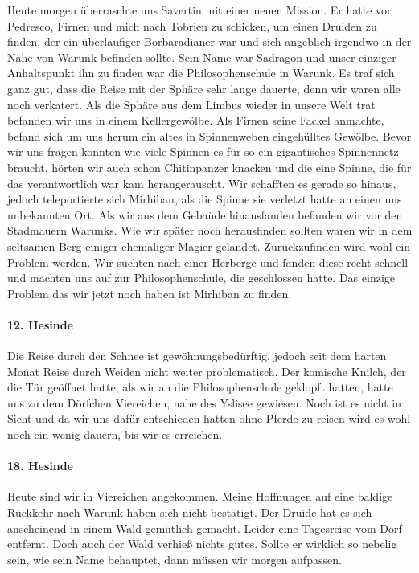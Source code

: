 Heute morgen überraschte uns Savertin mit einer neuen Mission. Er hatte vor Pedresco, Firnen und mich nach Tobrien zu schicken, um einen Druiden zu finden, der ein überläufiger Borbaradianer war und sich angeblich irgendwo in der Nähe von Warunk befinden sollte. Sein Name war Sadragon und unser einziger Anhaltspunkt ihn zu finden war die Philosophenschule in Warunk. Es traf sich ganz gut, dass die Reise mit der Sphäre sehr lange dauerte, denn wir waren alle noch verkatert. Als die Sphäre aus dem Limbus wieder in unsere Welt trat befanden wir uns in einem Kellergewölbe. Als Firnen seine Fackel anmachte, befand sich um uns herum ein altes in Spinnenweben eingehülltes Gewölbe. Bevor wir uns fragen konnten wie viele Spinnen es für so ein gigantisches Spinnennetz braucht, hörten wir auch schon Chitinpanzer knacken und die eine Spinne, die für das verantwortlich war kam herangerauscht. Wir schafften es gerade so hinaus, jedoch teleportierte sich Mirhiban, als die Spinne sie verletzt hatte an einen uns unbekannten Ort. Als wir aus dem Gebaüde hinausfanden befanden wir vor den Stadmauern Warunks. Wie wir später noch herausfinden sollten waren wir in dem seltsamen Berg einiger ehemaliger Magier gelandet. Zurückzufinden wird wohl ein Problem werden. Wir suchten nach einer Herberge und fanden diese recht schnell und machten uns auf zur Philosophenschule, die geschlossen hatte. Das einzige Problem das wir jetzt noch haben ist Mirhiban zu finden.

\paragraph{12. Hesinde}
Die Reise durch den Schnee ist gewöhnungsbedürftig, jedoch seit dem harten Monat Reise durch Weiden nicht weiter problematisch. Der komische Knilch, der die Tür geöffnet hatte, als wir an die Philosophenschule geklopft hatten, hatte uns zu dem Dörfchen Viereichen, nahe des Yslisee gewiesen. Noch ist es nicht in Sicht und da wir uns dafür entschieden hatten ohne Pferde zu reisen wird es wohl noch ein wenig dauern, bis wir es erreichen.

\paragraph{18. Hesinde}
Heute sind wir in Viereichen angekommen. Meine Hoffnungen auf eine baldige Rückkehr nach Warunk haben sich nicht bestätigt. Der Druide hat es sich anscheinend in einem Wald gemütlich gemacht. Leider eine Tagesreise vom Dorf entfernt. Doch auch der Wald verhieß nichts gutes. Sollte er wirklich so nebelig sein, wie sein Name behauptet, dann müssen wir morgen aufpassen.

